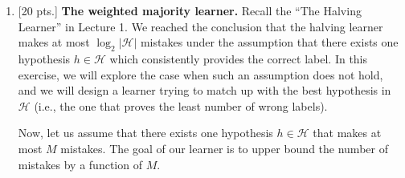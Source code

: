 \documentclass[12pt,letterpaper]{article}
\def \H{\mathcal H}
\def \x{\boldsymbol{x}}
\begin{document}
\begin{enumerate}
\begin{proof}[Solution]
  Suppose the contrary is true s.t. for $m=r+1$, $\forall C\subset \mathbb{R}^{n}, |C|=m$, $\H$ shatters $C=\{\x_{1},\x_{2},\cdots,\x_{m}\}$. Select a basis of $F$: $\mathbb{B}=\{f_{1},f_{2},\cdots,f_{r}\}$. Give points in $C$ an arbitrary lable. Since $\H$ shatters $C$, $\exists f(x)=\sum_{i=1}^{r}\alpha_{i}f_{i}(x)$ and a partition $I\cup J=\{1,2,\cdots,n\}, f(x_{i})\geq 0\quad\forall i\in I, f(x_{j})< 0\quad \forall j\in J$. This results in the equation:
  \[
    \begin{bmatrix}
      f_{1}(x_{1})&\cdots&f_{r}(x_{1})\\\vdots&\ddots&\vdots\\f_{1}(x_{m})&\cdots&f_{r}(x_{m})
    \end{bmatrix}
    \begin{bmatrix}
      \alpha_{1}\\\vdots\\\alpha_{r}
    \end{bmatrix}
    =
    \begin{bmatrix}
      \beta_{1}\\ \vdots\\\beta_{m}
    \end{bmatrix}
  \]
  where $\forall i\in I,\beta_{i}\geq 0;\forall j\in J, \beta_{j}<0$.

  This is an overdetermined equation, so unless rows of the matrix are linear related there's no solution (WLOG assume the last row can be linearly represented by others), but in this case $\beta_{m}$ is no longer free to be positive or negative, which is a contradiction.
\end{proof}





\item {[20 pts.]} {\bf The weighted majority learner.}
    Recall the ``The Halving Learner'' in Lecture 1. We reached the conclusion that the halving learner makes at most  $\log_2 |\H|$ mistakes under the assumption that there exists one hypothesis $h \in \H$ which consistently provides the correct label. In this exercise, we will explore the case when such an assumption does not hold, and we will design a learner trying to match up with the best hypothesis in $\H$ (i.e., the one that proves the least number of wrong labels).
    
    Now, let us assume that there exists one hypothesis $h \in \H$ that makes at most $M$ mistakes. The goal of our learner is to upper bound the number of mistakes by a function of $M$.
    

\end{enumerate}
\end{document}
